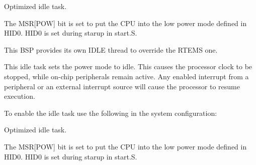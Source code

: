 Optimized idle task.

The M\+SR\mbox{[}P\+OW\mbox{]} bit is set to put the C\+PU into the low power mode defined in H\+I\+D0. H\+I\+D0 is set during starup in start.\+S.

This B\+SP provides its own I\+D\+LE thread to override the R\+T\+E\+MS one.

This idle task sets the power mode to idle. This causes the processor clock to be stopped, while on-\/chip peripherals remain active. Any enabled interrupt from a peripheral or an external interrupt source will cause the processor to resume execution.

To enable the idle task use the following in the system configuration\+:


\begin{DoxyCode}{0}
\DoxyCodeLine{\textcolor{preprocessor}{\#include <bsp.h>}}
\DoxyCodeLine{}
\DoxyCodeLine{\textcolor{preprocessor}{\#define CONFIGURE\_INIT}}
\DoxyCodeLine{}
\DoxyCodeLine{\textcolor{preprocessor}{\#define CONFIGURE\_IDLE\_TASK\_BODY bsp\_idle\_thread}}
\DoxyCodeLine{}
\end{DoxyCode}


Optimized idle task.

The M\+SR\mbox{[}P\+OW\mbox{]} bit is set to put the C\+PU into the low power mode defined in H\+I\+D0. H\+I\+D0 is set during starup in start.\+S. 